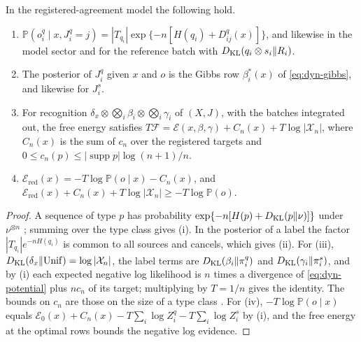 In the registered-agreement model the following hold.
\begin{enumerate}
\item[(i)] $\mathbb P(o^q_i\mid x,J^q_i=j)=|T_{q_i}|\exp\{-n[H(q_i)+D^q_{ij}(x)]\}$, and likewise in the model sector and for the reference batch with $D_{\mathrm{KL}}(q_i\otimes s_i\Vert R_i)$.
\item[(ii)] The posterior of $J^q_i$ given $x$ and $o$ is the Gibbs row $\beta^*_i(x)$ of \cref{eq:dyn-gibbs}, and likewise for $J^s_i$.
\item[(iii)] For recognition $\delta_x\otimes\bigotimes_i\beta_i\otimes\bigotimes_i\gamma_i$ of $(X,J)$, with the batches integrated out, the free energy satisfies $T\mathcal F=\mathcal E(x,\beta,\gamma)+C_n(x)+T\log|\mathcal X_n|$, where $C_n(x)$ is the sum of $c_n$ over the registered targets and $0\leq c_n(p)\leq|\operatorname{supp}p|\log(n+1)/n$.
\item[(iv)] $\mathcal E_{\mathrm{red}}(x)=-T\log\mathbb P(o\mid x)-C_n(x)$, and $\mathcal E_{\mathrm{red}}(x)+C_n(x)+T\log|\mathcal X_n|\geq-T\log\mathbb P(o)$.
\end{enumerate}
\begin{proof}
A sequence of type $p$ has probability $\exp\{-n[H(p)+D_{\mathrm{KL}}(p\Vert\nu)]\}$ under $\nu^{\otimes n}$ \citep[Theorem 11.1.2]{CoverThomas2006}; summing over the type class gives (i). In the posterior of a label the factor $|T_{q_i}|e^{-nH(q_i)}$ is common to all sources and cancels, which gives (ii). For (iii), $D_{\mathrm{KL}}(\delta_x\Vert\mathrm{Unif})=\log|\mathcal X_n|$, the label terms are $D_{\mathrm{KL}}(\beta_i\Vert\pi^q_i)$ and $D_{\mathrm{KL}}(\gamma_i\Vert\pi^s_i)$, and by (i) each expected negative log likelihood is $n$ times a divergence of \cref{eq:dyn-potential} plus $nc_n$ of its target; multiplying by $T=1/n$ gives the identity. The bounds on $c_n$ are those on the size of a type class \citep[Theorem 11.1.3]{CoverThomas2006}. For (iv), $-T\log\mathbb P(o\mid x)$ equals $\mathcal E_0(x)+C_n(x)-T\sum_i\log Z^q_i-T\sum_i\log Z^s_i$ by (i), and the free energy at the optimal rows bounds the negative log evidence.
\end{proof}

